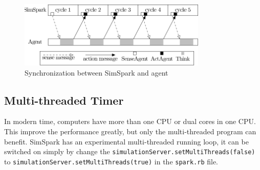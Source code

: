 \begin{figure}[htp]
  \centering
  \includegraphics[width=0.8\textwidth]{fig/synchronization}
  \caption{Synchronization between SimSpark and agent}
  \label{fig:synchronization}
\end{figure}

\subsection{Multi-threaded Timer}
In modern time, computers have more than one CPU or dual cores in one
CPU. This improve the performance greatly, but only the multi-threaded
program can benefit. SimSpark has an experimental multi-threaded
running loop, it can be switched on simply by change the
\texttt{simulationServer.setMultiThreads(false)} to
\texttt{simulationServer.setMultiThreads(true)} in the
\texttt{spark.rb} file.

